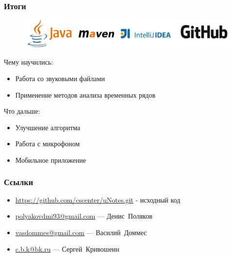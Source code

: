 \documentclass[11pt,slides,aspectratio=43]{beamer}%
\begin{document}
    \begin{frame}
	\frametitle{Итоги}
	   \begin{figure}[t!]
            \begin{center}
                \includegraphics[width =\textwidth]{logos.png}
            \end{center}
            \end{figure}
            
		Чему научились:
		\begin{itemize}
			\item Работа со звуковыми файлами
			\item Применение методов анализа временных рядов
		\end{itemize}
		Что дальше:
		\begin{itemize}
			\item Улучшение алгоритма
			\item Работа с микрофоном 
			\item Мобильное приложение
		\end{itemize}
	\end{frame}


    \begin{frame}
    \frametitle{Ссылки}
        \begin{itemize}
            \item \href{https://github.com/cscenter/uNotes.git}{https://github.com/cscenter/uNotes.git} - исходный код
            \item \href{polyakovdmi93@gmail.com}{polyakovdmi93@gmail.com} --- Денис~Поляков
            \item \href{vasdommes@gmail.com}{vasdommes@gmail.com}  --- Василий~Доммес
            \item \href{c.b.k@bk.ru}{c.b.k@bk.ru}  --- Сергей~Кривошеин
        \end{itemize}
	\end{frame}
\end{document}
